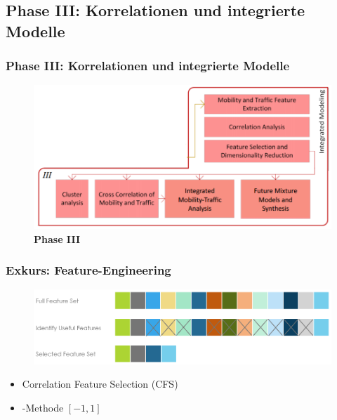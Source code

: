 \documentclass{beamer}
\begin{document}
\subsection{\textbf{Phase III}: Korrelationen und integrierte Modelle}

\begin{frame}
  \frametitle{Phase III: Korrelationen und integrierte Modelle}
  \begin{figure}
    \centering
    \includegraphics[width=\textwidth]{images/phase3.png}
    \caption*{\textbf{Phase III}}
  \end{figure}  
\end{frame}

\begin{frame}
  \frametitle{Exkurs: Feature-Engineering}

  \begin{figure}
    \centering
    \includegraphics[width=\textwidth]{images/feature_engineering.png}
  \end{figure}

  \begin{itemize}
    \item Correlation Feature Selection (\textsc{CFS})
    \item {}-Methode $[-1, 1]$
  \end{itemize}  
\end{frame}
\end{document}
